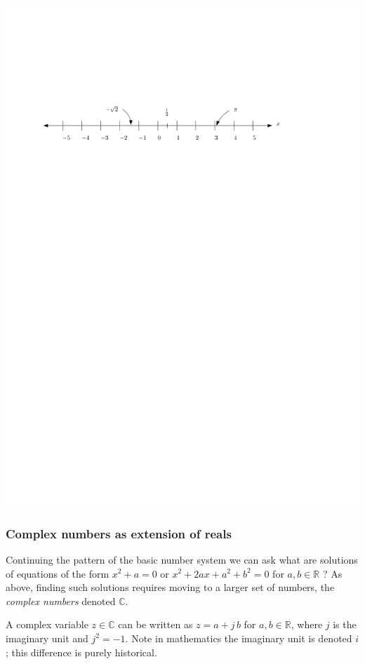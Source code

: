 \documentclass{article}
\begin{document}
\begin{center}
  \includegraphics[scale=1]{graphics/number-line.pdf}
\end{center}

\subsubsection{Complex numbers as extension of reals}

Continuing the pattern of the basic number system we can ask what are solutions of equations of the form $x^2+a = 0$ or $x^2 + 2ax +a^2 + b^2 = 0$ for $a,b \in \mathbb{R}$ ? As above, finding such solutions requires moving to a larger set of numbers, the \emph{complex numbers} denoted $\mathbb{C}$.

A complex variable $z\in\mathbb{C}$ can be written as $z = a + j\, b$ for $a,b\in\mathbb{R}$, where $j$ is the imaginary unit and $j^2 = -1$. Note in mathematics the imaginary unit is denoted $i$; this difference is purely historical. 
\end{document}
